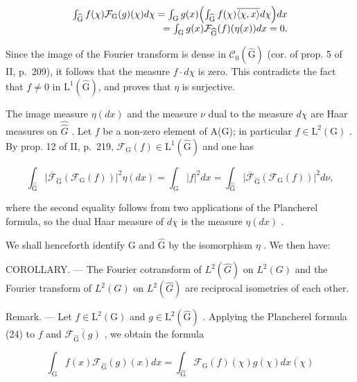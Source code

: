 \[
\begin{array}{r} \int_ {\widehat {\mathrm{G}}} f (\chi) \mathcal {F} _ {\mathrm{G}} (g) (\chi) d \chi = \int_ {\mathrm{G}} g (x) \Bigl (\int_ {\widehat {\mathrm{G}}} f (\chi) \overline {{\langle \chi , x \rangle}} d \chi \Bigr) d x \\ = \int_ {\mathrm{G}} g (x) \mathcal {F} _ {\widehat {\mathrm{G}}} (f) (\eta (x)) d x = 0. \end{array}
\]

Since the image of the Fourier transform is dense in \(\mathcal{C}_{0}(\widehat{\mathrm{G}})\) (cor. of prop. 5 of II, p.~209), it follows that the measure \(f \cdot d\chi\) is zero. This contradicts the fact that \(f \neq 0\) in \(\mathrm{L}^{1}(\widehat{\mathrm{G}})\), and proves that \(\eta\) is surjective.

The image measure \(\eta(dx)\) and the measure \(\nu\) dual to the measure \(d\chi\) are Haar measures on \(\widehat{\widehat{G}}\) . Let \(f\) be a non-zero element of A(G); in particular \(f \in \mathrm{L}^2(\mathrm{G})\) . By prop. 12 of II, p.~219, \(\mathcal{F}_{\mathrm{G}}(f) \in \mathrm{L}^{1}(\widehat{\mathrm{G}})\) and one has

\[
\int_ {\widehat {\widehat {\mathrm{G}}}} \Big | \overline {{\mathcal {F}}} _ {\widehat {\mathrm{G}}} (\mathcal {F} _ {\mathrm{G}} (f)) \Big | ^ {2} \eta (d x) = \int_ {\mathrm{G}} | f | ^ {2} d x = \int_ {\widehat {\widehat {\mathrm{G}}}} \Big | \overline {{\mathcal {F}}} _ {\widehat {\mathrm{G}}} (\mathcal {F} _ {\mathrm{G}} (f)) \Big | ^ {2} d \nu ,
\]

where the second equality follows from two applications of the Plancherel formula, so the dual Haar measure of \(d\chi\) is the measure \(\eta(dx)\) .

We shall henceforth identify G and \(\widehat{\mathrm{G}}\) by the isomorphism \(\eta\) . We then have:

COROLLARY. --- The Fourier cotransform of \(L^{2}(\widehat{G})\) on \(L^{2}(G)\) and the Fourier transform of \(L^{2}(G)\) on \(L^{2}(\widehat{G})\) are reciprocal isometries of each other.

Remark. --- Let \(f \in \mathrm{L}^2(\mathrm{G})\) and \(g \in \mathrm{L}^2(\widehat{\mathrm{G}})\) . Applying the Plancherel formula (24) to \(f\) and \(\overline{\mathcal{F}_{\widehat{\mathrm{G}}}(g)}\) , we obtain the formula

\[
\int_ {\mathrm{G}} f (x) \mathcal {F} _ {\widehat {\mathrm{G}}} (g) (x) d x = \int_ {\widehat {\mathrm{G}}} \mathcal {F} _ {\mathrm{G}} (f) (\chi) g (\chi) d \widehat {x} (\chi)\tag{29}
\]

